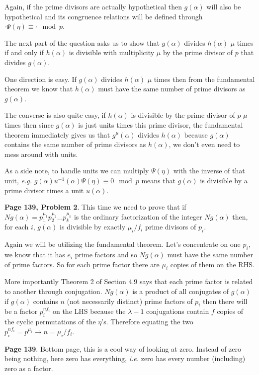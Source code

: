 \documentclass[aps,preprint,preprintnumbers,nofootinbib,showpacs,prd]{revtex4-1}
\newcommand{\ie}{{\it i.e.} }
\newcommand{\eg}{{\it e.g.} }
\begin{document}
Again, if the prime divisors are actually hypothetical then $g(\alpha)$ will also be hypothetical and its congruence relations will be defined through $\cdot \Psi(\eta) \equiv \cdot \mod{p}$.

The next part of the question asks us to show that $g(\alpha)$ divides $h(\alpha)$ $\mu$ times if and only if $h(\alpha)$ is divisible with multiplicity $\mu$ by the prime divisor of $p$ that divides $g(\alpha)$.

One direction is easy. If $g(\alpha)$ divides $h(\alpha)$ $\mu$ times then from the fundamental theorem we know that $h(\alpha)$ must have the same number of prime divisors as $g(\alpha)$.

The converse is also quite easy, if $h(\alpha)$ is divisible by the prime divisor of $p$ $\mu$ times then since $g(\alpha)$ is just units times this prime divisor, the fundamental theorem immediately gives us that $g^\mu(\alpha)$ divides $h(\alpha)$ because $g(\alpha)$ contains the same number of prime divisors as $h(\alpha)$, we don't even need to mess around with units.

As a side note, to handle units we can multiply $\Psi(\eta)$ with the inverse of that unit, \eg $g(\alpha) u^{-1}(\alpha)\Psi(\eta) \equiv 0 \mod{p}$ means that $g(\alpha)$ is divisible by a prime divisor times a unit $u(\alpha)$.

{\bf Page 139, Problem 2}. This time we need to prove that if $Ng(\alpha) = p_1^{\mu_1}p_2^{\mu_2} \dots p_k^{\mu_k}$ is the ordinary factorization of the integer $Ng(\alpha)$ then, for each $i$, $g(\alpha)$ is divisible by exactly $\mu_i/f_i$ prime divisors of $p_i$.

Again we will be utilizing the fundamental theorem. Let's concentrate on one $p_i$, we know that it has $e_i$ prime factors and so $Ng(\alpha)$ must have the same number of prime factors. So for each prime factor there are $\mu_i$ copies of them on the RHS.

More importantly Theorem 2 of Section 4.9 says that each prime factor is related to another through conjugation. $Ng(\alpha)$ is a product of all conjugates of $g(\alpha)$ if $g(\alpha)$ contains $n$ (not necessarily distinct) prime factors of $p_i$ then there will be a factor $p_i^{nf_i}$ on the LHS because the $\lambda - 1$ conjugations contain $f$ copies of the cyclic permutations of the $\eta$'s. Therefore equating the two $p_i^{nf_i} = p^{\mu_i} \to n = \mu_i/f_i$.


{\bf Page 139}. Bottom page, this is a cool way of looking at zero. Instead of zero being nothing, here zero has everything, \ie zero has every number (including) zero as a factor.
\end{document}
